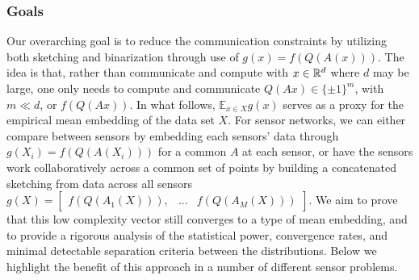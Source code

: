\subsubsection*{Goals}
Our overarching goal is to reduce the communication constraints by utilizing both sketching and binarization 
through use of $g(x) = f(Q(A(x)))$.   
The idea is that, rather than communicate and compute with $x\in \mathbb{R}^d$ where $d$ may be large, one only needs to compute and communicate $Q(Ax)\in \{\pm 1\}^m$, with $m\ll d$, or $f(Q(Ax))$. In what follows, $\mathbb{E}_{x\in X} g(x)$ serves as a proxy for the empirical mean embedding of the data set $X$.  
For sensor networks, we can either compare between sensors by embedding each sensors' data through $g(X_i) = f(Q(A(X_i)))$ for a common $A$ at each sensor, or have the sensors work collaboratively across a common set of points by building a concatenated sketching from data across all sensors $g(X) = \begin{bmatrix}f(Q(A_1(X))), & ... & f(Q(A_M(X))) \end{bmatrix}$.
We aim to prove that this low complexity vector still converges to a type of mean embedding, and to provide a rigorous analysis of the statistical power, convergence rates, and minimal detectable separation criteria between the distributions.  Below we highlight the benefit of this approach in a number of different sensor problems. 

